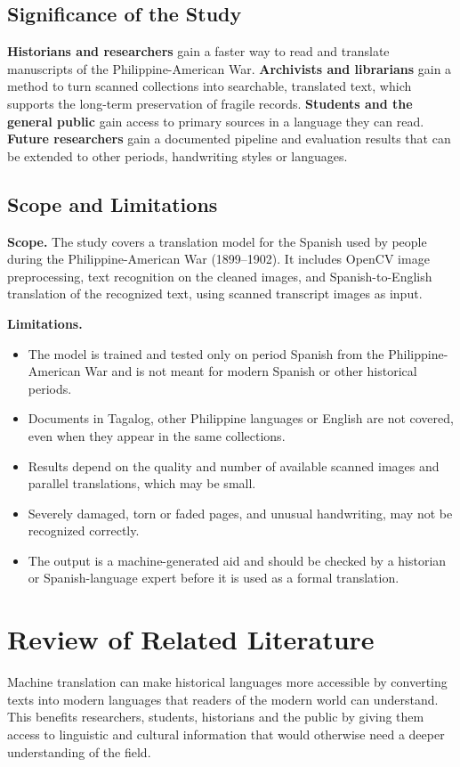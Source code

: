 \documentclass[10pt,twocolumn]{article}
\begin{document}
\subsection{Significance of the Study}
\textbf{Historians and researchers} gain a faster way to read and translate manuscripts of the Philippine-American War. \textbf{Archivists and librarians} gain a method to turn scanned collections into searchable, translated text, which supports the long-term preservation of fragile records. \textbf{Students and the general public} gain access to primary sources in a language they can read. \textbf{Future researchers} gain a documented pipeline and evaluation results that can be extended to other periods, handwriting styles or languages.

\subsection{Scope and Limitations}
\textbf{Scope.} The study covers a translation model for the Spanish used by people during the Philippine-American War (1899--1902). It includes OpenCV image preprocessing, text recognition on the cleaned images, and Spanish-to-English translation of the recognized text, using scanned transcript images as input.

\textbf{Limitations.}
\begin{itemize}
  \item The model is trained and tested only on period Spanish from the Philippine-American War and is not meant for modern Spanish or other historical periods.
  \item Documents in Tagalog, other Philippine languages or English are not covered, even when they appear in the same collections.
  \item Results depend on the quality and number of available scanned images and parallel translations, which may be small.
  \item Severely damaged, torn or faded pages, and unusual handwriting, may not be recognized correctly.
  \item The output is a machine-generated aid and should be checked by a historian or Spanish-language expert before it is used as a formal translation.
\end{itemize}

\section{Review of Related Literature}
Machine translation can make historical languages more accessible by converting texts into modern languages that readers of the modern world can understand. This benefits researchers, students, historians and the public by giving them access to linguistic and cultural information that would otherwise need a deeper understanding of the field.
\end{document}

